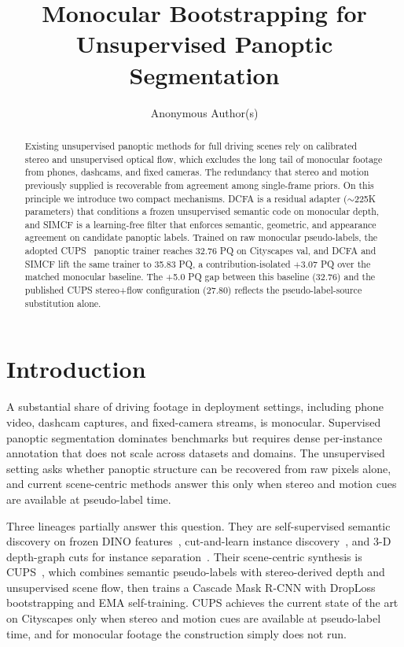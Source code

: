 \documentclass{article}
\title{Monocular Bootstrapping for Unsupervised Panoptic Segmentation}
\author{Anonymous Author(s)}
\begin{document}
\raggedbottom

\maketitle

\begin{abstract}
Existing unsupervised panoptic methods for full driving scenes rely on calibrated stereo and unsupervised optical flow, which excludes the long tail of monocular footage from phones, dashcams, and fixed cameras. The redundancy that stereo and motion previously supplied is recoverable from agreement among single-frame priors. On this principle we introduce two compact mechanisms. DCFA is a residual adapter ($\sim$225K parameters) that conditions a frozen unsupervised semantic code on monocular depth, and SIMCF is a learning-free filter that enforces semantic, geometric, and appearance agreement on candidate panoptic labels. Trained on raw monocular pseudo-labels, the adopted CUPS~\cite{hahn2025cups} panoptic trainer reaches 32.76 PQ on Cityscapes val, and DCFA and SIMCF lift the same trainer to 35.83 PQ, a contribution-isolated $+$3.07 PQ over the matched monocular baseline. The +5.0 PQ gap between this baseline (32.76) and the published CUPS stereo+flow configuration (27.80) reflects the pseudo-label-source substitution alone.
\end{abstract}

\section{Introduction}
\label{sec:intro}

A substantial share of driving footage in deployment settings, including phone video, dashcam captures, and fixed-camera streams, is monocular. Supervised panoptic segmentation dominates benchmarks but requires dense per-instance annotation that does not scale across datasets and domains. The unsupervised setting asks whether panoptic structure can be recovered from raw pixels alone, and current scene-centric methods answer this only when stereo and motion cues are available at pseudo-label time.

Three lineages partially answer this question. They are self-supervised semantic discovery on frozen DINO features~\cite{oquab2024dinov2,kim2024cause}, cut-and-learn instance discovery~\cite{wang2023cutler}, and 3-D depth-graph cuts for instance separation~\cite{sick2025cuts3d}. Their scene-centric synthesis is CUPS~\cite{hahn2025cups}, which combines semantic pseudo-labels with stereo-derived depth and unsupervised scene flow, then trains a Cascade Mask R-CNN with DropLoss bootstrapping and EMA self-training. CUPS achieves the current state of the art on Cityscapes only when stereo and motion cues are available at pseudo-label time, and for monocular footage the construction simply does not run.
\end{document}
